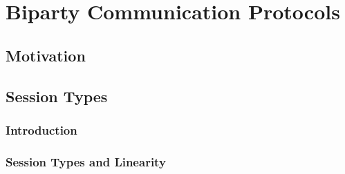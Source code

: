 \documentclass[a4paper,twoside]{article}
\newcommand{\TODO}[1]{\textcolor{YellowOrange}{(TODO)}} %
\begin{document}
%
%
%
%
%
%

\clearpage
\section{Biparty Communication Protocols}
\label{biparty}

\subsection{Motivation}

\subsection{Session Types}

\subsubsection{Introduction}

\subsubsection{Session Types and Linearity}
\end{document}
